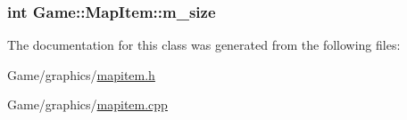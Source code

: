 \hypertarget{classGame_1_1MapItem_a7550fe4dec9a0b7d7f42e0d1f25c0813}{
\subsubsection[{m\-\_\-size}]{\setlength{\rightskip}{0pt plus 5cm}int Game\-::\-Map\-Item\-::m\-\_\-size\hspace{0.3cm}{\ttfamily [private]}}}\label{classGame_1_1MapItem_a7550fe4dec9a0b7d7f42e0d1f25c0813}


The documentation for this class was generated from the following files\-:\begin{DoxyCompactItemize}
\item 
Game/graphics/\hyperlink{mapitem_8h}{mapitem.\-h}\item 
Game/graphics/\hyperlink{mapitem_8cpp}{mapitem.\-cpp}\end{DoxyCompactItemize}
